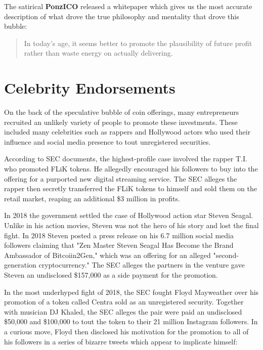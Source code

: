 
The satirical \textbf{PonzICO} released a whitepaper
\cite{cincinnati_ponzico_2017} which gives us the most accurate description of
what drove the true philosophy and mentality that drove this bubble:

\begin{quote}
In today's age, it seems better to promote the plausibility of future
profit rather than waste energy on actually delivering.
\end{quote}

\section{Celebrity Endorsements}

On the back of the speculative bubble of coin offerings, many entrepreneurs
recruited an unlikely variety of people to promote these investments. These
included many celebrities such as rappers and Hollywood actors who used their
influence and social media presence to tout unregistered securities.

According to SEC documents, the highest-profile case involved the rapper T.I.
who promoted FLiK tokens. He allegedly encouraged his followers to buy into the
offering for a purported new digital streaming service. The SEC alleges the
rapper then secretly transferred the FLiK tokens to himself and sold them on the
retail market, reaping an additional \$3 million in profits.


In 2018 the government settled the case of Hollywood action star Steven Seagal.
Unlike in his action movies, Steven was not the hero of his story and lost the
final fight. In 2018 Steven posted a press release on his 6.7 million social
media followers claiming that "Zen Master Steven Seagal Has Become the Brand
Ambassador of Bitcoiin2Gen," which was an offering for an alleged
"second-generation cryptocurrency." The SEC alleges the partners in the venture
gave Steven an undisclosed \$157,000 as a side payment for the promotion.


In the most underhyped fight of 2018, the SEC fought Floyd Mayweather over his
promotion of a token called Centra sold as an unregistered security. Together
with musician DJ Khaled, the SEC alleges the pair were paid an undisclosed
\$50,000 and \$100,000 to tout the token to their 21 million Instagram
followers. In a curious move, Floyd then disclosed his motivation for the
promotion to all of his followers in a series of bizarre tweets which appear to
implicate himself:

